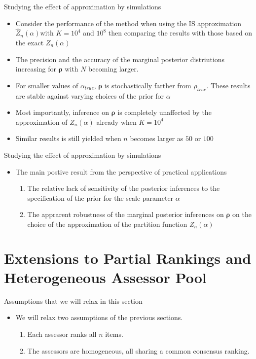 \documentclass[11pt]{beamer}
\begin{document}
\begin{frame}{Studying the effect of approximation by simulations}
\begin{itemize}
    \item Consider the performance of the method when using the IS approximation $\hat Z_n(\alpha)$with $K=10^4$ and $10^8$ then comparing the results with those based on the exact $Z_n(\alpha)$
    \item The precision and the accuracy of the marginal posterior distriutions increasing for $\boldsymbol{\rho}$ with $N$ becoming larger.
    \item For smaller values of $\alpha_{true}$, $\boldsymbol{\rho}$ is stochastically farther from $\rho_{true}$. These results are stable against varying choices of the prior for $\alpha$
    \item Most importantly, inference on $\boldsymbol{\rho}$ is completely unaffected by the approximation of $Z_n(\alpha)$ already when $K=10^4$
    \item Similar results is still yielded when $n$ becomes larger as $50$ or $100$
\end{itemize}
\end{frame}

\begin{frame}{Studying the effect of approximation by simulations}
\begin{itemize}
    \item The main postive result from the perspective of practical applications
    \begin{enumerate}
        \item The relative lack of sensitivity of the posterior inferences to the specification of the prior for the scale parameter $\alpha$
        \item The apprarent robustness of the marginal posterior inferences on $\boldsymbol{\rho}$ on the choice of the approximation of the partition function $Z_n(\alpha)$
    \end{enumerate}
\end{itemize}
\end{frame}

\section{Extensions to Partial Rankings and Heterogeneous Assessor Pool}
\begin{frame}{Assumptions that we will relax in this section}
\begin{itemize}
    \item We will relax two assumptions of the previous sections.
    \begin{enumerate}
        \item Each assessor ranks all $n$ items. 
        \item The assessors are homogeneous, all sharing a common consensus ranking.
    \end{enumerate}
\end{itemize}
\end{frame}
\end{document}
